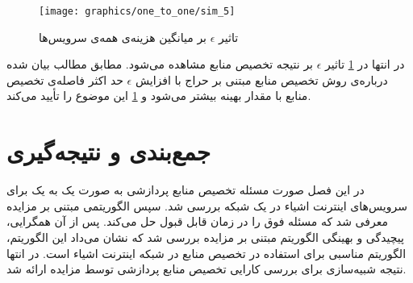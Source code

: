     \begin{figure}[H]
      \centerline{\texttt{[image: graphics/one\_to\_one/sim\_5]}}
      \caption{تاثیر $\epsilon$ بر میانگین هزینه‌ی همه‌ی سرویس‌ها}
      \label{fig:ono_to_one:sim5}
    \end{figure}

    در انتها در \cref{fig:ono_to_one:sim5} تاثیر $\epsilon$ بر نتیجه تخصیص منابع مشاهده می‌شود.
    مطابق مطالب بیان شده درباره‌ی روش تخصیص منابع مبتنی بر حراج با افزایش $\epsilon$ حد اکثر فاصله‌ی تخصیص منابع با مقدار بهینه بیشتر می‌شود و \cref{fig:ono_to_one:sim5} این موضوع را تأیید می‌کند.

  \section{جمع‌بندی و نتیجه‌گیری}
    در این فصل صورت مسئله تخصیص منابع پردازشی به صورت یک به یک برای سرویس‌های اینترنت اشیاء در یک شبکه بررسی شد.
    سپس الگوریتمی مبتنی بر مزایده معرفی  شد که مسئله فوق را در زمان قابل قبول حل می‌کند.
    پس از آن همگرایی، پیچیدگی و بهینگی الگوریتم مبتنی بر مزایده بررسی شد که نشان می‌داد این الگوریتم، الگوریتم مناسبی برای استفاده در تخصیص منابع در شبکه اینترنت اشیاء است.
    در انتها نتیجه شبیه‌سازی‌ برای بررسی کارایی تخصیص منابع پردازشی توسط مزایده ارائه شد.
